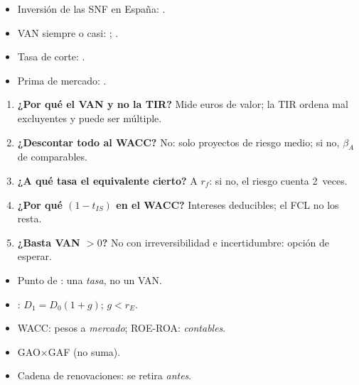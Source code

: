 \documentclass{article}
\begin{document}
\begin{columnas}
\anexorepaso
{}
\begin{itemize}
\item Inversión de las SNF en España: .
\item VAN siempre o casi: ; .
\item Tasa de corte: .
\item Prima de mercado: .
\end{itemize}
\begin{enumerate}
\item \textbf{¿Por qué el VAN y no la TIR?} Mide euros de valor; la TIR ordena mal excluyentes y puede ser múltiple.
\item \textbf{¿Descontar todo al WACC?} No: solo proyectos de riesgo medio; si no, $\beta_A$ de comparables.
\item \textbf{¿A qué tasa el equivalente cierto?} A $r_f$: si no, el riesgo cuenta 2~veces.
\item \textbf{¿Por qué $(1-t_{IS})$ en el WACC?} Intereses deducibles; el FCL no los resta.
\item \textbf{¿Basta VAN $>0$?} No con irreversibilidad e incertidumbre: opción de esperar.
\end{enumerate}
\begin{trampa}
\begin{itemize}
\item Punto de : una \emph{tasa}, no un VAN.
\item {}: $D_1=D_0(1+g)$; $g<r_E$.
\item WACC: pesos a \emph{mercado}; ROE-ROA: \emph{contables}.
\item GAO$\times$GAF (no suma).
\item Cadena de renovaciones: se retira \emph{antes}.
\end{itemize}
\end{trampa}

\end{columnas}
\end{document}
